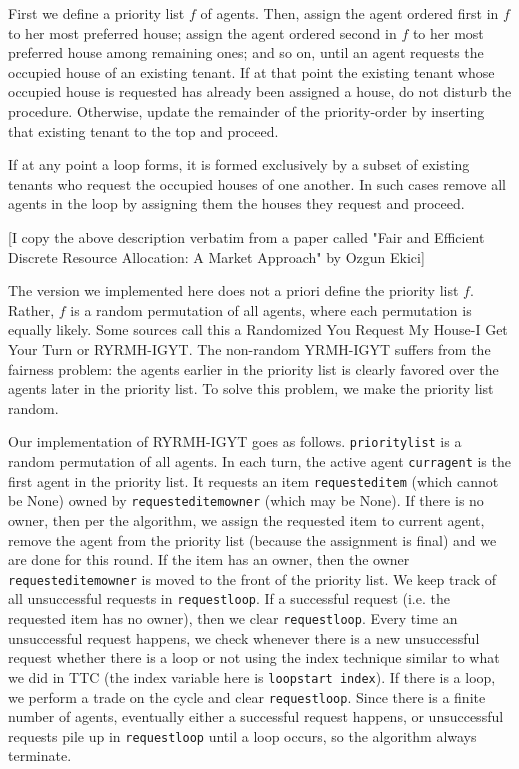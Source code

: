 \documentclass[12pt]{article}
\begin{document}
First we define a priority list $f$ of agents. Then, assign the agent ordered first in $f$ to her most preferred house; assign the agent ordered second in $f$ to her most preferred house among remaining ones; and so on, until an agent requests the occupied house of
an existing tenant. If at that point the existing tenant whose occupied house is requested
has already been assigned a house, do not disturb the procedure. Otherwise, update the remainder of the priority-order by inserting that existing tenant to the top and proceed.
 
If at any point a loop forms, it is formed exclusively by a subset of existing tenants who
request the occupied houses of one another. In such cases remove all agents in the loop
by assigning them the houses they request and proceed.
 
[I copy the above description verbatim from a paper called "Fair and Efficient Discrete Resource Allocation: A Market Approach" by Ozgun Ekici]
 
The version we implemented here does not a priori define the priority list $f$. Rather, $f$ is a random permutation of all agents, where each permutation is equally likely. Some sources call this a Randomized You Request My House-I Get Your Turn or RYRMH-IGYT. The non-random YRMH-IGYT suffers from the fairness problem: the agents earlier in the priority list is clearly favored over the agents later in the priority list. To solve this problem, we make the priority list random.
 
Our implementation of RYRMH-IGYT goes as follows. \texttt{priority\textunderscore list} is a random permutation of all agents. In each turn, the active agent \texttt{curr\textunderscore agent} is the first agent in the priority list. It requests an item \texttt{requested\textunderscore item} (which cannot be None) owned by \texttt{requested\textunderscore item\textunderscore owner} (which may be None). If there is no owner, then per the algorithm, we assign the requested item to current agent, remove the agent from the priority list (because the assignment is final) and we are done for this round. If the item has an owner, then the owner \texttt{requested\textunderscore item\textunderscore owner} is moved to the front of the priority list. We keep track of all unsuccessful requests in \texttt{request\textunderscore loop}. If a successful request (i.e. the requested item has no owner), then we clear \texttt{request\textunderscore loop}. Every time an unsuccessful request happens, we check whenever there is a new unsuccessful request whether there is a loop or not using the index technique similar to what we did in TTC (the index variable here is \texttt{loop\textunderscore start \textunderscore index}). If there is a loop, we perform a trade on the cycle and clear \texttt{request\textunderscore loop}. Since there is a finite number of agents, eventually either a successful request happens, or unsuccessful requests pile up in \texttt{request\textunderscore loop} until a loop occurs, so the algorithm always terminate.
 
\end{document}
